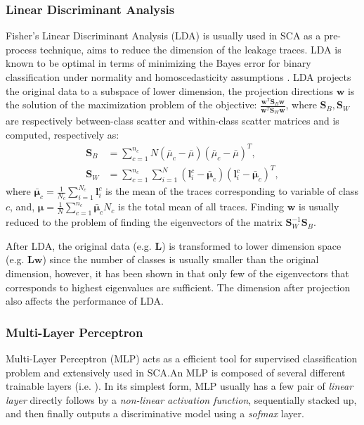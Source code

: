 \documentclass{llncs}
\begin{document}
\subsubsection*{Linear Discriminant Analysis}\label{ssec:lda}
Fisher's Linear Discriminant Analysis (LDA) is usually used in SCA as a pre-process technique, aims to reduce the dimension of the leakage traces. LDA is known to be optimal in terms of minimizing the Bayes error for binary classification under normality and homoscedasticity assumptions \cite{LDAKojo}. LDA projects the original data to a subspace of lower dimension, the projection directions $\mathbf{w}$ is the solution of the maximization problem of the objective: $\frac{\mathbf{w}^T \mathbf{S}_B \mathbf{w}}{\mathbf{w}^T \mathbf{S}_W \mathbf{w}}$, where $\mathbf{S}_B, \mathbf{S}_W$ are respectively between-class scatter and within-class scatter matrices and is computed, respectively as:
\begin{align*}
	\bm{S}_B &= \sum_{c=1}^{n_c}N(\bar{\mu}_c - \bar{\mu})(\bar{\mu}_c - \bar{\mu})^T,\\
	\bm{S}_W &=\sum_{c=1}^{n_c}\sum_{i=1}^N(\bm{l}^c_i - \bar{\bm{\mu}}_c) (\bm{l}^c_i - \bar{\bm{\mu}}_c)^T,
\end{align*}
where $\bar{\mathbf{\mu}}_c = \frac{1}{N_c}\sum_{i=1}^{N_c}\bm{l}^c_i$ is the mean of the traces corresponding to variable of class $c$, and,  $\bm{\mu} = \frac{1}{N}\sum_{c=1}^{n_c}\bar{\bm{\mu}}_c N_c$ is the total mean of all traces. Finding $\bm{w}$ is usually reduced to the problem of finding the eigenvectors of the matrix $\bm{S}_W^{-1}\bm{S}_B$.

After LDA, the original data (e.g. $\bm{L}$) is transformed to lower dimension space (e.g. $\bm{L} \bm{w}$) since the number of classes is usually smaller than the original dimension, however, it has been shown in that only few of the eigenvectors that corresponds to highest eigenvalues are sufficient. The dimension after projection also affects the performance of LDA.

\subsubsection*{Multi-Layer Perceptron} 
Multi-Layer Perceptron (MLP) acts as a efficient tool for supervised classification problem  and extensively used in SCA.An MLP is composed of several different  trainable layers (i.e. ). In its simplest form, MLP usually has a few pair of \textit{linear layer} directly follows by a \textit{non-linear activation function}, sequentially stacked up, and then finally outputs a discriminative model using a \textit{sofmax} layer. 
\end{document}
